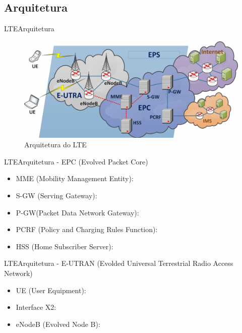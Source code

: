 \documentclass[10pt,aspectratio=169]{beamer} %
\begin{document}
\subsection{Arquitetura}
\begin{frame}{LTE}{Arquitetura}
\begin{figure}[!htb]
    \centering
    \includegraphics[scale=0.7]{LRCgraphics/The-LTE-Architecture.png}
    \caption{Arquitetura do LTE \cite{liyanage2015leveraging}}
\end{figure}
\end{frame}
\begin{frame}{LTE}{Arquitetura - EPC (Evolved Packet Core)}
    \begin{itemize}
        \item MME (Mobility Management Entity):
        \item S-GW (Serving Gateway):
        \item P-GW(Packet Data Network Gateway):
        \item PCRF (Policy and Charging Rules Function):
        \item HSS (Home Subscriber Server):
    \end{itemize}
\end{frame}
\begin{frame}{LTE}{Arquitetura - E-UTRAN (Evolded Universal Terrestrial Radio Access Network)}
    \begin{itemize}
        \item UE (User Equipment):
        \item Interface X2: %
        \item eNodeB (Evolved Node B):
    \end{itemize}
\end{frame}
\end{document}
